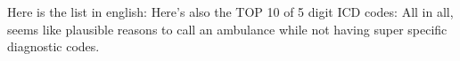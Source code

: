 Here is the list in english:\markdownRendererInterblockSeparator
{}\markdownRendererInterblockSeparator
{}Here's also the TOP 10 of 5 digit ICD codes:\markdownRendererInterblockSeparator
{}\markdownRendererInterblockSeparator
{}All in all, seems like plausible reasons to call an ambulance while not having super specific diagnostic codes.\relax